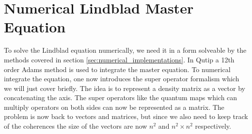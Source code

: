 

\section{Numerical Lindblad Master Equation}
To solve the Lindblad equation numerically, we need it in a form solveable by the methods covered in section \ref{sec:numerical_implementations}. In Qutip \cite{qutip} a 12th order Adams method is used to integrate the master equation. To numerical integrate the equation, one now introduces the super operator formalism which we will just cover briefly. The idea is to represent a density matrix as a vector by concatenating the axis. The super operators like the quantum maps which can multiply operators on both sides can now be represented as a matrix. The problem is now back to vectors and matrices, but since we also need to keep track of the coherences the size of the vectors are now $n^2$ and $n^2\times n^2$ respectively.

